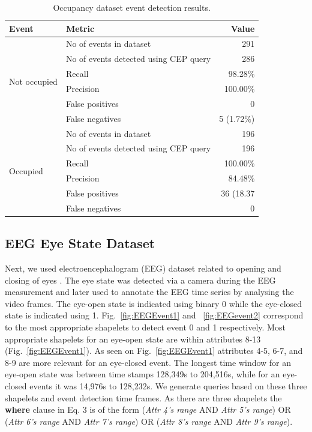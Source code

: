 \documentclass[conference]{IEEEtran}  %
\begin{document}
\begin{table}
\caption{Occupancy dataset event detection results.}
\begin{tabular}{ |l|l|l| }
\hline
\textbf{Event} & \textbf{Metric} & \multicolumn{1}{|r|}{\textbf{Value}}\\
\hline
\multirow{6}{*}{Not occupied} & No of events in dataset & \multicolumn{1}{|r|}{291}\\
    & No of events detected using CEP query & \multicolumn{1}{|r|}{286}\\ 
    & Recall & \multicolumn{1}{|r|}{98.28\%}\\
    & Precision & \multicolumn{1}{|r|}{100.00\%}\\
    & False positives & \multicolumn{1}{|r|}{0}\\
    & False negatives & \multicolumn{1}{|r|}{5 (1.72\%)}\\
\hline
\multirow{6}{*}{Occupied} & No of events in dataset & \multicolumn{1}{|r|}{196}\\
    & No of events detected using CEP query & \multicolumn{1}{|r|}{196}\\
    & Recall & \multicolumn{1}{|r|}{100.00\%}\\
    & Precision & \multicolumn{1}{|r|}{84.48\%}\\
    & False positives & \multicolumn{1}{|r|}{36 (18.37}\\
    & False negatives & \multicolumn{1}{|r|}{0}\\
\hline
\end{tabular}
\squeezeup\squeezeup
\end{table}


\subsection{EEG Eye State Dataset}
Next, we used electroencephalogram (EEG) dataset related to opening and closing of eyes \cite{IEEEexample:EEG}. The eye state was detected via a camera during the EEG measurement and later used to annotate the EEG time series by analysing the video frames. The eye-open state is indicated using binary 0 while the eye-closed state is indicated using 1. Fig.~\ref{fig:EEGEvent1} and ~\ref{fig:EEGevent2} correspond to the most appropriate shapelets to detect event 0 and 1 respectively. Most appropriate shapelets for an eye-open state are within attributes 8-13 (Fig.~\ref{fig:EEGEvent1}). As seen on Fig.~\ref{fig:EEGEvent1} attributes 4-5, 6-7, and 8-9 are more relevant for an eye-closed event. The longest time window for an eye-open state was between time stamps 128,349s to 204,516s, while for an eye-closed events it was 14,976s to 128,232s. We generate queries based on these three shapelets and event detection time frames. As there are three shapelets the \textbf{where} clause in Eq. 3 is of the form (\textit{Attr 4's range} AND \textit{Attr 5's range}) OR (\textit{Attr 6's range} AND \textit{Attr 7's range}) OR (\textit{Attr 8's range} AND \textit{Attr 9's range}).
\end{document}
